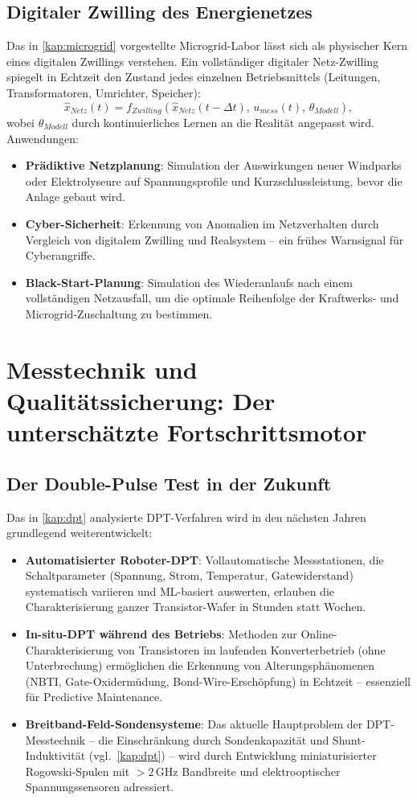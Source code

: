 ﻿\documentclass[a4paper,12pt,openany,oneside]{book}
\newcommand{\abschnitt}[1]{\section{#1}}
\newcommand{\unterabschnitt}[1]{\subsection{#1}}
\theoremstyle{definition}
\begin{document}
\unterabschnitt{Digitaler Zwilling des Energienetzes}

Das in \autoref{kap:microgrid} vorgestellte Microgrid-Labor l\"asst sich als physischer
Kern eines digitalen Zwillings verstehen. Ein vollst\"andiger digitaler Netz-Zwilling
spiegelt in Echtzeit den Zustand jedes einzelnen Betriebsmittels (Leitungen, Transformatoren,
Umrichter, Speicher):
\[
  \hat{x}_{Netz}(t) = f_{Zwilling}(\hat{x}_{Netz}(t-\Delta t),\, u_{mess}(t),\, \theta_{Modell}),
\]
wobei $\theta_{Modell}$ durch kontinuierliches Lernen an die Realit\"at angepasst wird.
Anwendungen:
\begin{itemize}
  \item \textbf{Pr\"adiktive Netzplanung}: Simulation der Auswirkungen neuer Windparks oder
    Elektrolyseure auf Spannungsprofile und Kurzschlussleistung, bevor die Anlage gebaut wird.
  \item \textbf{Cyber-Sicherheit}: Erkennung von Anomalien im Netzverhalten durch Vergleich
    von digitalem Zwilling und Realsystem -- ein fr\"uhes Warnsignal f\"ur Cyberangriffe.
  \item \textbf{Black-Start-Planung}: Simulation des Wiederanlaufs nach einem vollst\"andigen
    Netzausfall, um die optimale Reihenfolge der Kraftwerks- und Microgrid-Zuschaltung zu
    bestimmen.
\end{itemize}

\abschnitt{Messtechnik und Qualit\"atssicherung: Der untersch\"atzte Fortschrittsmotor}

\unterabschnitt{Der Double-Pulse Test in der Zukunft}

Das in \autoref{kap:dpt} analysierte DPT-Verfahren wird in den n\"achsten Jahren
grundlegend weiterentwickelt:

\begin{itemize}
  \item \textbf{Automatisierter Roboter-DPT}: Vollautomatische Messstationen, die Schalt\-parameter
    (Spannung, Strom, Temperatur, Gatewiderstand) systematisch variieren und
    ML-basiert auswerten, erlauben die Charakterisierung ganzer Transistor-Wafer in Stunden
    statt Wochen.
  \item \textbf{In-situ-DPT w\"ahrend des Betriebs}: Methoden zur Online-Charakterisierung
    von Transistoren im laufenden Konverterbetrieb (ohne Unterbrechung) erm\"oglichen die
    Erkennung von Alterungsph\"anomenen (NBTI, Gate-Oxiderm\"udung, Bond-Wire-Ersch\"opfung)
    in Echtzeit -- essenziell f\"ur Predictive Maintenance.
  \item \textbf{Breitband-Feld-Sondensysteme}: Das aktuelle Hauptproblem der DPT-Messtechnik
    -- die Einschr\"ankung durch Sondenkapazit\"at und Shunt-Induktivit\"at (vgl.\ \autoref{kap:dpt})
    -- wird durch Entwicklung miniaturisierter Rogowski-Spulen mit $> 2\,\mathrm{GHz}$
    Bandbreite und elektrooptischer Spannungssensoren adressiert.
\end{itemize}
\end{document}
